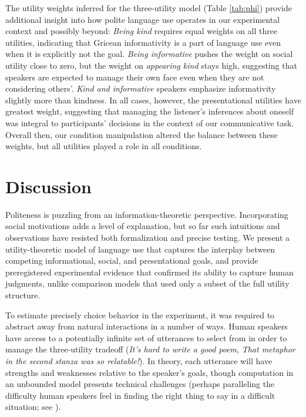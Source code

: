 \documentclass[9pt,twocolumn,twoside,lineno]{main_class_file}
\begin{document}
The utility weights inferred for the three-utility model (Table \ref{tab:phi})
provide additional insight into how polite language use operates in our experimental context and possibly beyond:
\emph{Being kind} requires equal weights on all three utilities,
indicating that Gricean informativity is a part of language use
even when it is explicitly not the goal.
\emph{Being informative} pushes
the weight on social utility close to zero, but the weight on
\emph{appearing kind} stays high, suggesting that speakers are expected
to manage their own face even when they are not considering others'.
\emph{Kind and informative} speakers emphasize informativity slightly
more than kindness. 
In all cases, however, the presentational utilities have greatest weight, 
suggesting that managing the listener's inferences about oneself was integral to participants' decisions in the context of our  communicative task.
Overall then, our condition manipulation altered the balance between these weights, 
but all utilities played a role in all conditions.

\section*{Discussion}

Politeness is puzzling from an information-theoretic perspective.
Incorporating social motivations adds a level of explanation, but so far such intuitions and observations have resisted both formalization and precise testing.
We present a utility-theoretic model of language use that captures the interplay between competing
informational, social, and presentational goals, and provide preregistered
experimental evidence that confirmed its ability to capture human
judgments, unlike comparison models that used only a subset of the full
utility structure.

To estimate precisely choice behavior in the experiment,
it was required to abstract away
from natural interactions in a number of ways.
Human speakers have access
to a potentially infinite set of utterances to select from in order to manage the three-utility tradeoff (\emph{It's hard to write a good poem}, \emph{That
metaphor in the second stanza was so relatable!}). In theory,
each utterance will have strengths and weaknesses relative to the
speaker's goals, though computation in an unbounded model presents
technical challenges (perhaps paralleling the difficulty human speakers
feel in finding the right thing to say in a difficult situation; see \cite{goodman2016}).
\end{document}
